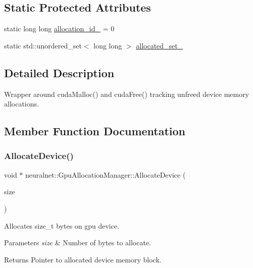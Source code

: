 \subsection*{Static Protected Attributes}
\begin{DoxyCompactItemize}
\item 
static long long \hyperlink{classneuralnet_1_1GpuAllocationManager_a5af99716544aa62af9d223f134178324}{allocation\+\_\+id\+\_\+} = 0
\item 
static std\+::unordered\+\_\+set$<$ long long $>$ \hyperlink{classneuralnet_1_1GpuAllocationManager_a8551c1a8fa5e6628e3db91f3724b71c9}{allocated\+\_\+set\+\_\+}
\end{DoxyCompactItemize}


\subsection{Detailed Description}
Wrapper around cuda\+Malloc() and cuda\+Free() tracking unfreed device memory allocations. 

\subsection{Member Function Documentation}
\mbox{\label{classneuralnet_1_1GpuAllocationManager_ac5326b5c0b3cfe942583a2d9e858912b}} 
\subsubsection{\texorpdfstring{Allocate\+Device()}{AllocateDevice()}}
{\footnotesize\ttfamily void $\ast$ neuralnet\+::\+Gpu\+Allocation\+Manager\+::\+Allocate\+Device (\begin{DoxyParamCaption}\item[{size\+\_\+t}]{size }\end{DoxyParamCaption})}



Allocates size\+\_\+t bytes on gpu device. 


\begin{DoxyParams}{Parameters}
{\em size} & Number of bytes to allocate. \\
\hline
\end{DoxyParams}
\begin{DoxyReturn}{Returns}
Pointer to allocated device memory block. 
\end{DoxyReturn}


